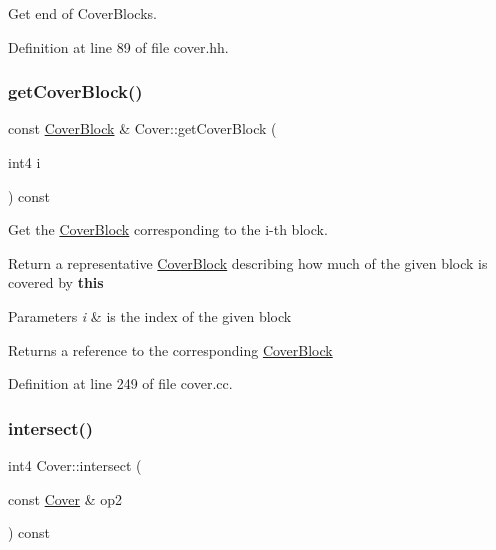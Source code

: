 Get end of Cover\+Blocks. 



Definition at line 89 of file cover.\+hh.

\mbox{\label{class_cover_aa795f795e17e4860b810b068a61142ef}} 
\subsubsection{\texorpdfstring{getCoverBlock()}{getCoverBlock()}}
{\footnotesize\ttfamily const \mbox{\hyperlink{class_cover_block}{Cover\+Block}} \& Cover\+::get\+Cover\+Block (\begin{DoxyParamCaption}\item[{int4}]{i }\end{DoxyParamCaption}) const}



Get the \mbox{\hyperlink{class_cover_block}{Cover\+Block}} corresponding to the i-\/th block. 

Return a representative \mbox{\hyperlink{class_cover_block}{Cover\+Block}} describing how much of the given block is covered by {\bfseries{this}} 
\begin{DoxyParams}{Parameters}
{\em i} & is the index of the given block \\
\hline
\end{DoxyParams}
\begin{DoxyReturn}{Returns}
a reference to the corresponding \mbox{\hyperlink{class_cover_block}{Cover\+Block}} 
\end{DoxyReturn}


Definition at line 249 of file cover.\+cc.

\mbox{\label{class_cover_ad296bbe5ac0596e41c9d65d11aeb3d05}} 
\subsubsection{\texorpdfstring{intersect()}{intersect()}}
{\footnotesize\ttfamily int4 Cover\+::intersect (\begin{DoxyParamCaption}\item[{const \mbox{\hyperlink{class_cover}{Cover}} \&}]{op2 }\end{DoxyParamCaption}) const}



